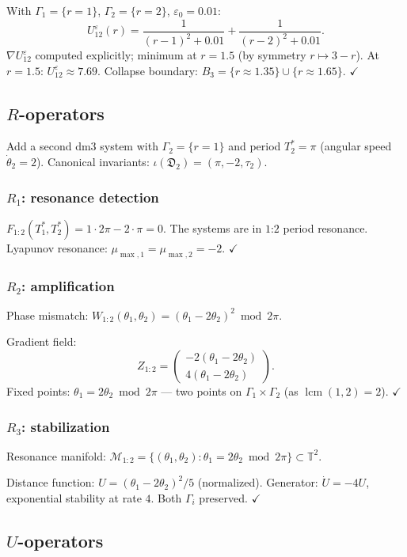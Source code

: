 \documentclass[reqno]{amsart}
\numberwithin{equation}{section}
\theoremstyle{plain}
\theoremstyle{definition}
\theoremstyle{remark}
\newcommand{\T}{\mathbb{T}}
\newcommand{\dm}{\mathfrak{D}}
\newcommand{\Orb}{\Gamma}
\newcommand{\cM}{\mathcal{M}}
\newcommand{\eps}{\varepsilon}
\DeclareMathOperator{\lcm}{lcm}
\begin{document}
With $\Orb_1=\{r=1\}$, $\Orb_2=\{r=2\}$, $\eps_0=0.01$:
\[
  U_{12}^\eps(r)
  = \frac{1}{(r-1)^2+0.01} + \frac{1}{(r-2)^2+0.01}.
\]
$\nabla U_{12}^\eps$ computed explicitly; minimum at $r=1.5$
(by symmetry $r\mapsto 3-r$). At $r=1.5$: $U_{12}^\eps\approx 7.69$.
Collapse boundary: $B_3=\{r\approx 1.35\}\cup\{r\approx 1.65\}$. $\checkmark$

\subsection{\texorpdfstring{$R$}{R}-operators}

Add a second dm3 system with $\Orb_2=\{r=1\}$ and period $T_2^*=\pi$
(angular speed $\dot\theta_2=2$). Canonical invariants:
$\iota(\dm_2)=(\pi,-2,\tau_2)$.

\subsubsection{$R_1$: resonance detection}

$F_{1:2}(T_1^*,T_2^*)=1\cdot 2\pi-2\cdot\pi=0$.
The systems are in $1$:$2$ period resonance.
Lyapunov resonance: $\mu_{\max,1}=\mu_{\max,2}=-2$. $\checkmark$

\subsubsection{$R_2$: amplification}

Phase mismatch: $W_{1:2}(\theta_1,\theta_2)=(\theta_1-2\theta_2)^2
\bmod 2\pi$.

Gradient field:
\[
  Z_{1:2} = \begin{pmatrix}-2(\theta_1-2\theta_2)\\
  4(\theta_1-2\theta_2)\end{pmatrix}.
\]
Fixed points: $\theta_1=2\theta_2\bmod 2\pi$ --- two points on
$\Orb_1\times\Orb_2$ (as $\lcm(1,2)=2$). $\checkmark$

\subsubsection{$R_3$: stabilization}

Resonance manifold:
$\cM_{1:2}=\{(\theta_1,\theta_2):\theta_1=2\theta_2\bmod 2\pi\}
\subset\T^2$.

Distance function: $U=(\theta_1-2\theta_2)^2/5$ (normalized).
Generator: $\dot U=-4U$, exponential stability at rate $4$.
Both $\Orb_i$ preserved. $\checkmark$

\subsection{\texorpdfstring{$U$}{U}-operators}
\end{document}

